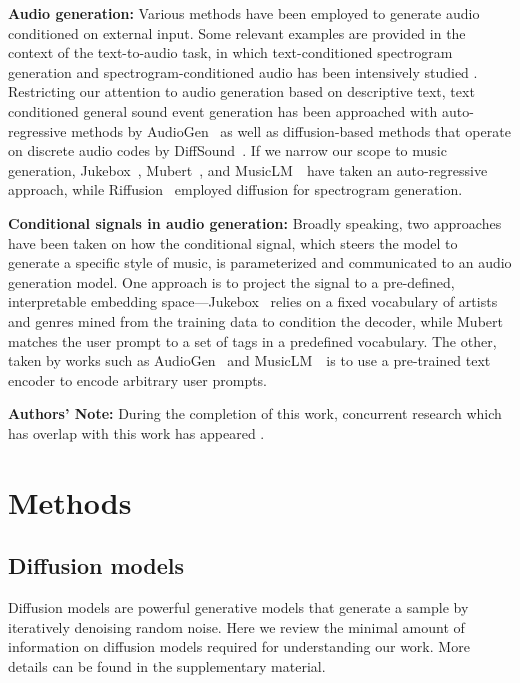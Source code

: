 \documentclass[nohyperref]{article}
\newcommand{\MusicLM}{MusicLM~\cite{musiclm2023}}
\theoremstyle{plain}
\theoremstyle{definition}
\theoremstyle{remark}
\begin{document}
\noindent\textbf{Audio generation:}
Various methods have been employed to generate audio conditioned on external input. Some relevant examples are provided in the context of the text-to-audio task, in which text-conditioned spectrogram generation and spectrogram-conditioned audio has been intensively studied \cite{popov2021grad, chen2021wavegrad, kong2021diffwave, wu2021otts, chen2022infergrad}. Restricting our attention to audio generation based on descriptive text, text conditioned general sound event generation has been approached with auto-regressive methods by AudioGen~\cite{kreuk2022audiogen} as well as diffusion-based methods that operate on discrete audio codes by DiffSound~\cite{yang2022diffsound}. If we narrow our scope to music generation, Jukebox~\cite{dhariwal2020jukebox}, Mubert~\cite{mubert}, and \MusicLM~have taken an auto-regressive approach, while Riffusion~\cite{Forsgren_Martiros_2022} employed diffusion for spectrogram generation.

\noindent\textbf{Conditional signals in audio generation:}
Broadly speaking, two approaches have been taken on how the conditional signal, which steers the model to generate a specific style of music, is parameterized and communicated to an audio generation model. One approach is to project the signal to a pre-defined, interpretable embedding space---Jukebox~\cite{dhariwal2020jukebox} relies on a fixed vocabulary of artists and genres mined from the training data to condition the decoder, while Mubert~\cite{mubert} matches the user prompt to a set of tags in a predefined vocabulary. The other, taken by works such as AudioGen~\cite{kreuk2022audiogen} and \MusicLM~is to use a pre-trained text encoder to encode arbitrary user prompts.


\noindent\textbf{Authors' Note:}
During the completion of this work, concurrent research which has overlap with this work has appeared \cite{schneider2023}.

\section{Methods}

\subsection{Diffusion models}
\label{ss:diffusion-models}

Diffusion models \cite{sohl2015deep,song2019generative,ho2020denoising} are powerful generative models that generate a sample by iteratively denoising random noise. Here we review the minimal amount of information on diffusion models required for understanding our work. More details can be found in the supplementary material.
\end{document}
